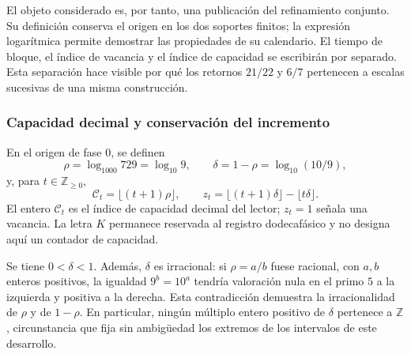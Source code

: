 El objeto considerado es, por tanto, una publicación del refinamiento
conjunto. Su definición conserva el origen en los dos soportes finitos;
la expresión logarítmica permite demostrar las propiedades de su
calendario. El tiempo de bloque, el índice de vacancia y el índice de
capacidad se escribirán por separado. Esta separación hace visible por
qué los retornos \(21/22\) y \(6/7\) pertenecen a escalas sucesivas de
una misma construcción.

\subsubsection{Capacidad decimal y conservación del incremento}
\label{viii:vac-add-capacidad}

\begin{definition}
\label{viii:vac-add-definicion}
En el origen de fase \(0\), se definen
\begin{equation}
 \rho=\log_{1000}729=\log_{10}9,
 \qquad \delta=1-\rho=\log_{10}(10/9),
 \label{viii:vac-add-densidad}
\end{equation}
y, para \(t\in\mathbb Z_{\geq0}\),
\begin{equation}
 \mathcal C_t=\lfloor(t+1)\rho\rfloor,
 \qquad
 z_t=\lfloor(t+1)\delta\rfloor-\lfloor t\delta\rfloor.
 \label{viii:vac-add-indices}
\end{equation}
El entero \(\mathcal C_t\) es el índice de capacidad decimal del lector;
\(z_t=1\) señala una vacancia. La letra \(K\) permanece reservada al
registro dodecafásico y no designa aquí un contador de capacidad.
\end{definition}

Se tiene \(0<\delta<1\). Además, \(\delta\) es irracional: si
\(\rho=a/b\) fuese racional, con \(a,b\) enteros positivos, la igualdad
\(9^b=10^a\) tendría valoración nula en el primo \(5\) a la izquierda
y positiva a la derecha. Esta contradicción demuestra la irracionalidad
de \(\rho\) y de \(1-\rho\). En particular, ningún múltiplo entero
positivo de \(\delta\) pertenece a \(\mathbb Z\), circunstancia que
fija sin ambigüedad los extremos de los intervalos de este desarrollo.

